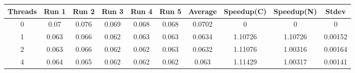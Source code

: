 \begin{itemize}
\begin{center}
 \begin{adjustbox}{width=\columnwidth, center} 
 \begin{tabular}{ | |c | c c c c c | c | c c | c | |} \hline 
 Threads & Run 1 & Run 2 & Run 3 & Run 4 & Run 5 & Average & Speedup(C) & Speedup(N) & Stdev \\ [0.5ex] 
 \hline 
 \hline 
0& 0.07 & 0.076 & 0.069 & 0.068 & 0.068 & 0.0702 & 0 & 0 & 0\\ 
 \hline
1& 0.063 & 0.066 & 0.062 & 0.063 & 0.063 & 0.0634 & 1.10726 & 1.10726 & 0.00152\\ 
 \hline
2& 0.063 & 0.066 & 0.062 & 0.062 & 0.063 & 0.0632 & 1.11076 & 1.00316 & 0.00164\\ 
 \hline
4& 0.064 & 0.065 & 0.062 & 0.062 & 0.062 & 0.063 & 1.11429 & 1.00317 & 0.00141\\ 
 \hline
\end{tabular} 
 \end{adjustbox} 
 \end{center} 
\end{itemize}
